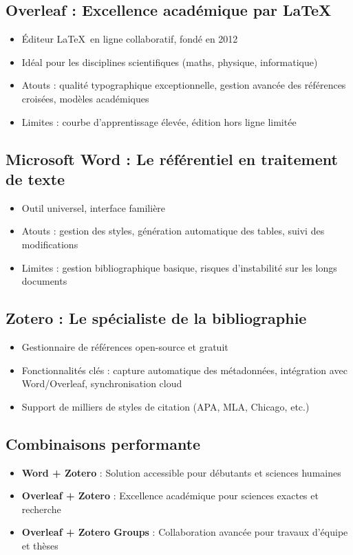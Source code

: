 \documentclass[12pt, a4em]{article}
\begin{document}
	\subsection{Overleaf : Excellence académique par \LaTeX}
	\begin{itemize}
		\item Éditeur \LaTeX\ en ligne collaboratif, fondé en 2012
		\item Idéal pour les disciplines scientifiques (maths, physique, informatique)
		\item Atouts : qualité typographique exceptionnelle, gestion avancée des références croisées, modèles académiques
		\item Limites : courbe d'apprentissage élevée, édition hors ligne limitée
	\end{itemize}
	
	\subsection{Microsoft Word : Le référentiel en traitement de texte}
	\begin{itemize}
		\item Outil universel, interface familière
		\item Atouts : gestion des styles, génération automatique des tables, suivi des modifications
		\item Limites : gestion bibliographique basique, risques d'instabilité sur les longs documents
	\end{itemize}
	
	\subsection{Zotero : Le spécialiste de la bibliographie}
	\begin{itemize}
		\item Gestionnaire de références open-source et gratuit
		\item Fonctionnalités clés : capture automatique des métadonnées, intégration avec Word/Overleaf, synchronisation cloud
		\item Support de milliers de styles de citation (APA, MLA, Chicago, etc.)
	\end{itemize}
	
	\subsection{Combinaisons performante}
	\begin{itemize}
		\item \textbf{Word + Zotero} : Solution accessible pour débutants et sciences humaines
		\item \textbf{Overleaf + Zotero} : Excellence académique pour sciences exactes et recherche
		\item \textbf{Overleaf + Zotero Groups} : Collaboration avancée pour travaux d'équipe et thèses
	\end{itemize}
	
\end{document}
